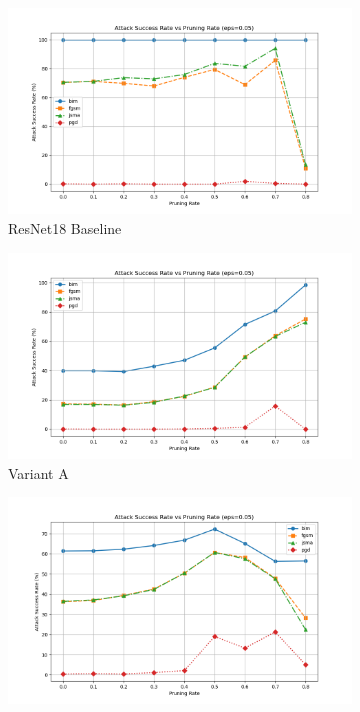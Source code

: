 \documentclass[preprint,12pt]{elsarticle}
\begin{document}
\begin{figure}[!t]
\centering
\begin{subfigure}[b]{0.24\columnwidth}
\centering
\includegraphics[width=\columnwidth]{fig/asr-prunning/roct/roct_0.05_resnet18.png}
\caption{ResNet18 Baseline}
\label{fig:asr_resnet18_005_a}
\end{subfigure}
\hfill
\begin{subfigure}[b]{0.24\columnwidth}
\centering
\includegraphics[width=\columnwidth]{fig/asr-prunning/roct/roct_0.05_no_afd_mfe_msf.png}
\caption{Variant A}
\label{fig:asr_no_afd_mfe_msf_005_a}
\end{subfigure}
\hfill
\begin{subfigure}[b]{0.24\columnwidth}
\centering
\includegraphics[width=\columnwidth]{fig/asr-prunning/roct/roct_0.05_no_afd_mfe.png}

\end{subfigure}
\end{figure}
\end{document}
